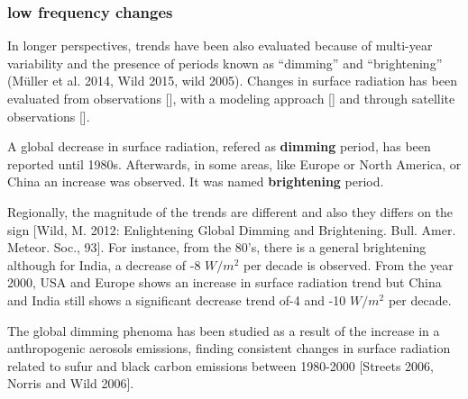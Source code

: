  

\subsubsection{low frequency changes}

In longer perspectives, trends have been also evaluated because of multi-year variability and the presence of periods known as “dimming” and “brightening” (Müller et al. 2014, Wild 2015, wild 2005). Changes in surface radiation has been evaluated from observations [], with a modeling approach [] and through satellite observations [].

A global decrease in surface radiation, refered as \textbf{dimming} period,  has been reported until 1980s. Afterwards, in some areas, like Europe or North America, or China an increase was observed. It was named \textbf{brightening} period. 

Regionally, the magnitude of the trends are different and also they differs on the sign [Wild, M. 2012: Enlightening Global Dimming and Brightening. Bull. Amer. Meteor. Soc., 93]. For instance, from the 80's, there is a general brightening although for India, a decrease of -8 $W/m^2$  per decade is observed. From the year 2000, USA and Europe shows an increase in surface radiation trend but China and India still shows a significant decrease trend of-4 and -10 $W/m^2$ per decade. 

The global dimming phenoma has been studied as a result of the increase in a anthropogenic aerosols emissions, finding consistent changes in surface radiation related to sufur and black carbon emissions between 1980-2000 [Streets 2006, Norris and Wild 2006].

